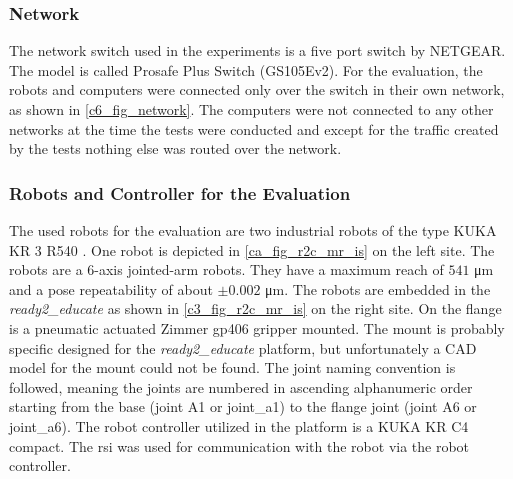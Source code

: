 \subsubsection{Network}\label{c6_sec_network}
The network switch used in the experiments is a five port switch by NETGEAR. The model is called Prosafe Plus Switch (GS105Ev2). For the evaluation, the robots and computers were connected only over the switch in their own network, as shown in \autoref{c6_fig_network}. The computers were not connected to any other networks at the time the tests were conducted and except for the traffic created by the tests nothing else was routed over the network.



\subsubsection{Robots and Controller for the Evaluation}\label{c3_sec_used_robots}
The used robots for the evaluation are two industrial robots of the type KUKA KR 3 R540 \cite{noauthor_agile_nodate, noauthor_kuka_kr_3_agiluspdf_nodate}. One robot is depicted in \autoref{ca_fig_r2c_mr_is} on the left site. The robots are a 6-axis jointed-arm robots. They have a maximum reach of $541$ \si{\micro\meter} and a pose repeatability of about $\pm 0.002$ \si{\micro\meter}. The robots are embedded in the \textit{ready2\_educate} as shown in \autoref{c3_fig_r2c_mr_is} on the right site. On the flange is a pneumatic actuated Zimmer gp406 gripper mounted. The mount is probably specific designed for the \textit{ready2\_educate} platform, but unfortunately a CAD model for the mount could not be found. \newline
The joint naming convention is followed, meaning the joints are numbered in ascending alphanumeric order starting from the base (joint A1 or joint\_a1) to the flange joint (joint A6 or joint\_a6).\newline
The robot controller utilized in the platform is a KUKA KR C4 compact. The \acrfull{rsi}  was used for communication with the robot via the robot controller.
